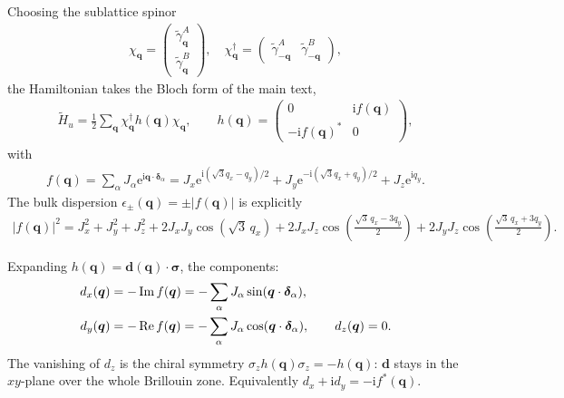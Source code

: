 \documentclass[
  aps,
  prl,
  preprint,
  amsmath,
  amssymb,
  superscriptaddress,
  floatfix
]{revtex4-2}
\newcommand{\ii}{\mathrm{i}}
\newcommand{\ee}{\mathrm{e}}
\renewcommand{\abs}[1]{\left| #1 \right|}
\begin{document}
Choosing the sublattice spinor
\begin{align}
  \chi_{\bm{q}} = \begin{pmatrix}
        \tilde\gamma_{\bm{q}}^{A} \\[4pt]
        \tilde\gamma_{\bm{q}}^{B}
    \end{pmatrix},
    \quad \chi_{\bm q}^{\dag} = \begin{pmatrix} \tilde\gamma_{-\bm q}^{A} & \tilde\gamma_{-\bm q}^{B} \end{pmatrix},
    \label{eq:sm_spinor}
\end{align}
the Hamiltonian takes the Bloch form of the main text,
\begin{align}
  \tilde{H}_u = \frac{1}{2} \sum_{\bm q} \chi_{\bm q}^\dag h(\bm q) \chi_{\bm q}, \qquad h(\bm q) = \begin{pmatrix}
    0 & \ii f(\bm q) \\
    - \ii f(\bm q)^* & 0
  \end{pmatrix},
  \label{eq:sm_bloch}
\end{align}
with
\begin{align}
  f(\bm q) = \sum_\alpha J_\alpha \ee^{\ii \bm q\cdot\bm\delta_\alpha}
  = J_x \ee^{\ii(\sqrt{3}q_x - q_y)/2}
           + J_y \ee^{-\ii(\sqrt{3}q_x + q_y)/2}
           + J_z \ee^{\ii q_y}.
  \label{eq:sm_fq}
\end{align}
The bulk dispersion $\epsilon_\pm(\bm q)=\pm\abs{f(\bm q)}$ is explicitly
\begin{align}
  \abs{f(\bm{q})}^2 = J_x^2 + J_y^2 + J_z^2
      + 2J_xJ_y\cos\!\left(\sqrt{3}\,q_x\right)
      + 2J_xJ_z\cos\!\left(\tfrac{\sqrt{3}\,q_x - 3q_y}{2}\right)
      + 2J_yJ_z\cos\!\left(\tfrac{\sqrt{3}\,q_x + 3q_y}{2}\right).
\end{align}

Expanding $h(\bm q)=\bm d(\bm q)\cdot\bm\sigma$, the components:
\begin{align}
  d_x(\bm q) &= -\operatorname{Im} f(\bm q) = -\sum_\alpha J_\alpha \sin(\bm q\cdot\bm\delta_\alpha), \notag\\
  d_y(\bm q) &= -\operatorname{Re} f(\bm q) = -\sum_\alpha J_\alpha \cos(\bm q\cdot\bm\delta_\alpha),
  \qquad
  d_z(\bm q) = 0 .
  \label{eq:sm_dvector}
\end{align}
The vanishing of $d_z$ is the chiral symmetry $\sigma_z
h(\bm q)\sigma_z=-h(\bm q)$: $\bm d$ stays in the $xy$-plane over the
whole Brillouin zone. Equivalently $d_x+\ii d_y=-\ii f^*(\bm q)$.
\end{document}
